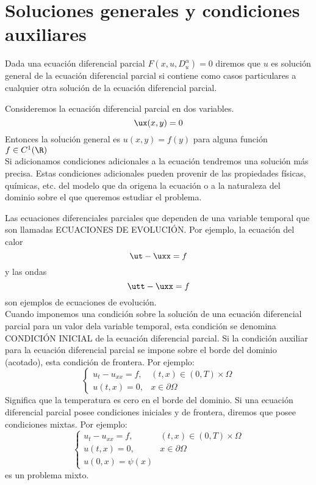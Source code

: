 \section{Soluciones generales y condiciones auxiliares}
Dada una ecuación diferencial parcial $F(x,u,D^{\alpha}_u)=0$ diremos que $u$ es solución general de la ecuación diferencial parcial si contiene como casos particulares a cualquier otra solución de la ecuación diferencial parcial.
\begin{Ejm}
    Consideremos la ecuación diferencial parcial en dos variables.
    $$\ux(x,y)=0$$
    Entonces la solución general es $u(x,y)=f(y)$ para alguna función $f\in C^1(\R)$\\
    Si adicionamos condiciones adicionales a la ecuación tendremos una solución más precisa. Estas condiciones adicionales pueden provenir de las propiedades físicas, químicas, etc. del modelo que da origena la ecuación o a la naturaleza del dominio sobre el que queremos estudiar el problema.
\end{Ejm}
Las ecuaciones diferenciales parciales que dependen de una variable temporal que son llamadas ECUACIONES DE EVOLUCIÓN. Por ejemplo, la ecuación del calor  $$\ut-\uxx=f$$ y las ondas $$\utt-\uxx=f$$ son ejemplos de ecuaciones de evolución.\\Cuando imponemos una condición sobre la solución de una ecuación diferencial parcial para un valor dela variable temporal, esta condición se denomina CONDICIÓN INICIAL de la ecuación diferencial parcial.
Si la condición auxiliar para la ecuación diferencial parcial se impone sobre el borde del dominio (acotado), esta condición de frontera. Por ejemplo:
$$
\begin{cases}
    u_t-u_{xx}=f,
    & \mbox{$(t,x)\in (0,T)\times\Omega$}\\
    u(t,x)=0, & \mbox{$x\in\partial\Omega$}
\end{cases}
$$
Significa que la temperatura es cero en el borde del dominio. Si una ecuación diferencial parcial posee condiciones iniciales y de frontera, diremos que posee condiciones mixtas. Por ejemplo:$$
\begin{cases}
    u_t-u_{xx}=f,
    & \mbox{$(t,x)\in (0,T)\times\Omega$}\\
    u(t,x)=0, & \mbox{$x\in\partial\Omega$}\\
    u(0,x)=\psi(x)
\end{cases}
$$
es un problema mixto.